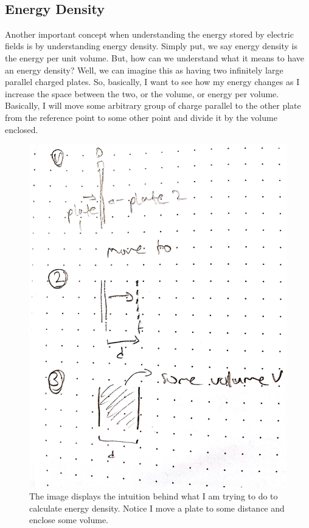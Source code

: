 \documentclass{article}
\begin{document}
\\
\subsection{Energy Density}
Another important concept when understanding the energy stored by electric fields is by understanding energy density. Simply put, we say energy density is the energy per unit volume. But, how can we understand what it means to have an energy density? Well, we can imagine this as having two infinitely large parallel charged plates. So, basically, I want to see how my energy changes as I increase the space between the two, or the volume, or energy per volume. Basically, I will move some arbitrary group of charge parallel to the other plate from the reference point to some other point and divide it by the volume enclosed. 

\begin{figure}[ht]
\center
\includegraphics[width=.3\textwidth]{images/Week2pic4.jpg}
\caption{The image displays the intuition behind what I am trying to do to calculate energy density. Notice I move a plate to some distance and enclose some volume.}
\end{figure}
\end{document}
